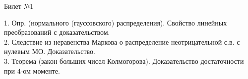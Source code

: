 \documentclass[preview]{standalone}
\begin{document}
 
\begin{center} {\Large Билет №1} \end{center} 

1.  Опр. (нормального (гауссовского) распределения). Свойство линейных преобразований с доказательством.\\

2.  Следствие из неравенства Маркова о распределение неотрицательной с.в. с нулевым МО. Доказательство.\\

3.  Теорема (закон больших чисел Колмогорова). Доказательство достаточности при 4-ом моменте.\\
\end{document}
